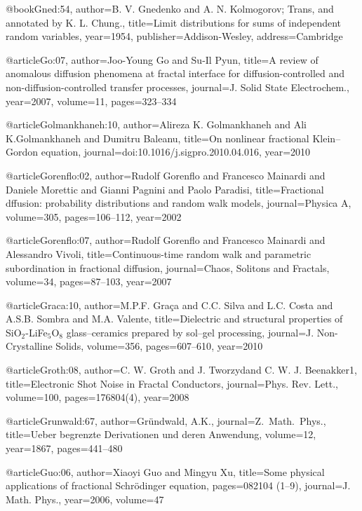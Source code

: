 \begin{thebibliography}{99}
@book{Gned:54,
  author={B. V. Gnedenko and A. N. Kolmogorov; Trans, and annotated by K. L. Chung.},
  title={Limit distributions for sums of independent random variables},
  year={1954},
  publisher={Addison-Wesley},
  address={Cambridge}
}

@article{Go:07,
  author={Joo-Young Go and Su-Il Pyun},
  title={A review of anomalous diffusion phenomena at fractal interface for diffusion-controlled
    and non-diffusion-controlled transfer processes},
  journal={J. Solid State Electrochem.},
  year={2007},
  volume={11},
  pages={323--334}
}

@article{Golmankhaneh:10,
  author={Alireza K. Golmankhaneh and Ali K.Golmankhaneh and Dumitru Baleanu},
  title={On nonlinear fractional {K}lein--{G}ordon equation},
  journal={doi:10.1016/j.sigpro.2010.04.016},
  year={2010}
}

@article{Gorenflo:02,
  author={Rudolf Gorenflo and Francesco Mainardi and Daniele Morettic and Gianni
    Pagnini and Paolo Paradisi},
  title={Fractional dffusion: probability distributions and random walk models},
  journal={Physica A},
  volume={305},
  pages={106--112},
  year={2002}
}

@article{Gorenflo:07,
  author={Rudolf Gorenflo and Francesco Mainardi and Alessandro Vivoli},
  title={Continuous-time random walk and parametric subordination in fractional
    diffusion},
  journal={Chaos, Solitons and Fractals},
  volume={34},
  pages={87--103},
  year={2007}
}

@article{Graca:10,
  author={M.P.F. Gra\c{c}a and C.C. Silva and L.C. Costa and A.S.B. Sombra and
    M.A. Valente},
  title={Dielectric and structural properties of {SiO$_2$-LiFe$_5$O$_8$} glass--ceramics
    prepared by sol--gel processing},
  journal={J. Non-Crystalline Solids},
  volume={356},
  pages={607--610},
  year={2010}
}

@article{Groth:08,
  author={C. W. Groth and J. Tworzyd\lo and C. W. J. Beenakker1},
  title={Electronic Shot Noise in Fractal Conductors},
  journal={Phys. Rev. Lett.},
  volume={100},
  pages={176804(4)},
  year={2008}
}

@article{Grunwald:67,
  author={Gr{\"u}ndwald, A.K.},
  journal={Z.\ Math.\ Phys.},
  title={Ueber begrenzte {D}erivationen und deren {A}nwendung},
  volume={12},
  year={1867},
  pages={441--480}
}

@article{Guo:06,
  author={Xiaoyi Guo and Mingyu Xu},
  title={Some physical applications of fractional {S}chr\"{o}dinger equation},
  pages={082104 (1--9)},
  journal={J. Math. Phys.},
  year={2006},
  volume={47}
}


\end{thebibliography}
